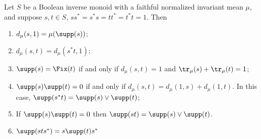 \begin{lemma}\label{lemmasupportssofic}
Let $S$ be a Boolean inverse monoid with a faithful normalized invariant mean $\mu$, and suppose $s,t\in S$, $ss^*=s^*s=tt^*=t^*t=1$. Then
\begin{enumerate}
\item[(a)] $d_\mu(s,1)=\mu(\supp(s))$;
\item[(b)] $d_\mu(s,t)=d_\mu(s^*t,1)$;
\item[(c)] $\supp(s)=\Fix(t)$ if and only if $d_\mu(s,t)=1$ and $\tr_\mu(s)+\tr_\mu(t)=1$;
\item[(d)] $\supp(s)\supp(t)=0$ if and only if $d_\mu(s,t)=d_\mu(1,s)+d_\mu(1,t)$. In this case, $\supp(s^*t)=\supp(s)\lor\supp(t)$;
\item[(e)] If $\supp(s)\supp(t)=0$ then $\supp(st)=\supp(s)\lor\supp(t)$.
\item[(f)] $\supp(sts^*)=s\supp(t)s^*$
\end{enumerate}
\end{lemma}
